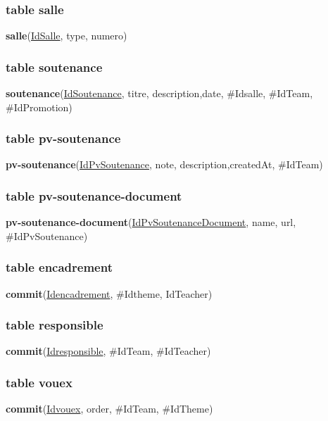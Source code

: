 \documentclass[11pt,fleqn]{book} %
\begin{document}
\subsubsection{table salle}
\hspace{3em}\textbf{salle}(\underline{IdSalle}, type, numero)

\subsubsection{table soutenance}
\hspace{3em}\textbf{soutenance}(\underline{IdSoutenance}, titre, description,date, \#Idsalle, \#IdTeam, \#IdPromotion)

\subsubsection{table pv-soutenance}
\hspace{3em}\textbf{pv-soutenance}(\underline{IdPvSoutenance}, note, description,createdAt, \#IdTeam)
\subsubsection{table pv-soutenance-document}
\hspace{3em}\textbf{pv-soutenance-document}(\underline{IdPvSoutenanceDocument}, name, url, \#IdPvSoutenance)

\subsubsection{table encadrement}
\hspace{3em}\textbf{commit}(\underline{Idencadrement}, \#Idtheme, IdTeacher)

\subsubsection{table responsible}
\hspace{3em}\textbf{commit}(\underline{Idresponsible},  \#IdTeam, \#IdTeacher)

\subsubsection{table vouex}
\hspace{3em}\textbf{commit}(\underline{Idvouex}, order,  \#IdTeam, \#IdTheme)
\end{document}

